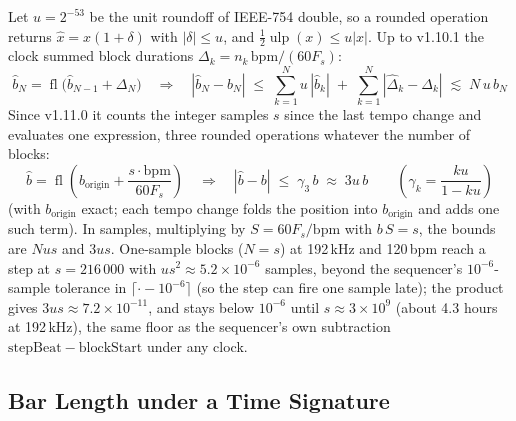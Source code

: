 \documentclass[11pt,letterpaper]{article}
\newcommand{\Fs}{F_s}
\begin{document}
Let $u = 2^{-53}$ be the unit roundoff of IEEE-754 double, so a rounded operation returns $\hat x = x(1+\delta)$ with $|\delta| \le u$,
and $\tfrac12\operatorname{ulp}(x) \le u|x|$. Up to v1.10.1 the clock summed block durations $\Delta_k = n_k\,\mathrm{bpm}/(60\Fs)$:
\begin{equation}\label{eq:clocksum}
  \hat b_N = \operatorname{fl}\!\bigl(\hat b_{N-1} + \Delta_N\bigr) \quad\Longrightarrow\quad
  |\hat b_N - b_N| \;\le\; \sum_{k=1}^{N} u\,|\hat b_k| \;+\; \sum_{k=1}^{N}|\hat\Delta_k - \Delta_k| \;\lesssim\; N\,u\,b_N
\end{equation}
Since v1.11.0 it counts the integer samples $s$ since the last tempo change and evaluates one expression, three rounded operations
whatever the number of blocks:
\begin{equation}\label{eq:clockprod}
  \hat b = \operatorname{fl}\!\left(b_{\mathrm{origin}} + \frac{s \cdot \mathrm{bpm}}{60\Fs}\right) \quad\Longrightarrow\quad
  |\hat b - b| \;\le\; \gamma_3\, b \;\approx\; 3u\,b \qquad \left(\gamma_k = \frac{ku}{1-ku}\right)
\end{equation}
(with $b_{\mathrm{origin}}$ exact; each tempo change folds the position into $b_{\mathrm{origin}}$ and adds one such term). In samples,
multiplying by $S = 60\Fs/\mathrm{bpm}$ with $b\,S = s$, the bounds are $N u s$ and $3us$. One-sample blocks ($N = s$) at 192\,kHz and
120\,bpm reach a step at $s = 216\,000$ with $u s^2 \approx 5.2\times10^{-6}$ samples, beyond the sequencer's $10^{-6}$-sample tolerance in
$\lceil \cdot - 10^{-6}\rceil$ (so the step can fire one sample late); the product gives $3us \approx 7.2\times10^{-11}$, and stays below
$10^{-6}$ until $s \approx 3\times10^{9}$ (about 4.3 hours at 192\,kHz), the same floor as the sequencer's own subtraction
$\mathrm{stepBeat} - \mathrm{blockStart}$ under any clock.

\subsection{Bar Length under a Time Signature}
\end{document}
